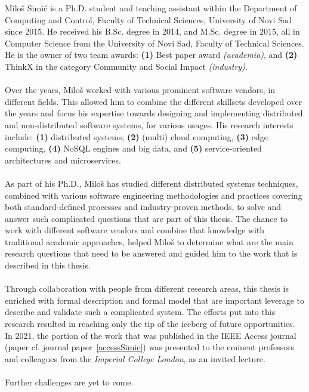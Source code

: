 \noindent
Milo\v s Simi\'c is a Ph.D. student and teaching assistant within the Department of Computing and Control, Faculty of Technical Sciences,  University of Novi Sad since 2015. He received his B.Sc. degree in 2014, and M.Sc. degree in 2015, all in Computer Science from the University of Novi Sad, Faculty of Technical Sciences. He is the owner of two team awards: \textbf{(1)} Best paper award \emph{(academia)}, and \textbf{(2)} ThinkX in the category Community and Social Impact \emph{(industry)}.\\\\
\noindent
Over the years, Milo\v s worked with various prominent software vendors, in different fields. This allowed him to combine the different skillsets developed over the years and focus his expertise towards designing and implementing distributed and non-distributed software systems, for various usages. His research interests include: \textbf{(1)} distributed systems, \textbf{(2)} (multi) cloud computing, \textbf{(3)} edge computing, \textbf{(4)} NoSQL engines and big data, and \textbf{(5)} service-oriented architectures and microservices.\\\\
\noindent
As part of his Ph.D., Milo\v s has studied different distributed systems techniques, combined with various software engineering methodologies and practices covering both standard-defined processes and industry-proven methods, to solve and answer such complicated questions that are part of this thesis. The chance to work with different software vendors and combine that knowledge with traditional academic approaches, helped Milo\v s to determine what are the main research questions that need to be answered and guided him to the work that is described in this thesis.\\\\
\noindent
Through collaboration with people from different research areas, this thesis is enriched with formal description and formal model that are important leverage to describe and validate such a complicated system. The efforts put into this research resulted in reaching only the tip of the iceberg of future opportunities. In 2021, the portion of the work that was published in the IEEE Access journal (paper cf. journal paper~\ref{accessSimic}) was presented to the eminent professors and colleagues from the \emph{Imperial College London}, as an invited lecture.\\\\

\noindent
Further challenges are yet to come.
%
%